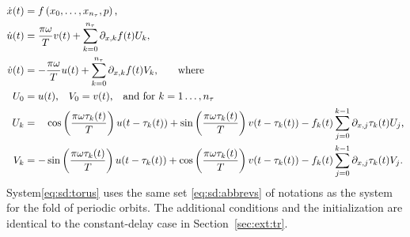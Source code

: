 \documentclass[11pt]{scrartcl}
\begin{document}
\begin{equation}
  \label{eq:sd:torus}
  \begin{aligned}
    \dot x(t)&=f\left(x_0,\ldots,x_{n_\tau},p\right)\mbox{,}\\
        \dot u(t)&= \frac{\pi\omega}{T}v(t)+
        \sum_{k=0}^{n_\tau}\partial_{x,k}f(t)U_k\mbox{,}\\
        \dot v(t)&= -\frac{\pi\omega}{T}u(t)+
        \sum_{k=0}^{n_\tau}\partial_{x,k}f(t)V_k\mbox{,\qquad where}\\
        U_0&=u(t)\mbox{,}\quad V_0=v(t)
        \mbox{,\quad and for $k=1\ldots,n_\tau$}\\
        U_k&=\phantom{-}
        \cos\left(\frac{\pi\omega\tau_k(t)}{T}\right)u(t-\tau_k(t))
        +\sin\left(\frac{\pi\omega\tau_k(t)}{T}\right)v(t-\tau_k(t))
        -f_k(t)\sum_{j=0}^{k-1}\partial_{x,j}
    \tau_k(t)U_j\mbox{,}\\
        V_k&=-\sin\left(\frac{\pi\omega\tau_k(t)}{T}\right)u(t-\tau_k(t))+
        \cos\left(\frac{\pi\omega\tau_k(t)}{T}\right)v(t-\tau_k(t))
        -f_k(t)\sum_{j=0}^{k-1}\partial_{x,j}
    \tau_k(t)V_j\mbox{.}
  \end{aligned}
\end{equation}
System\eqref{eq:sd:torus} uses the same set \eqref{eq:sd:abbrevs} of
notations as the system for the fold of periodic orbits.  The
additional conditions and the initialization are identical to the constant-delay case in Section~\ref{sec:ext:tr}.

 
\appendix
\end{document}

